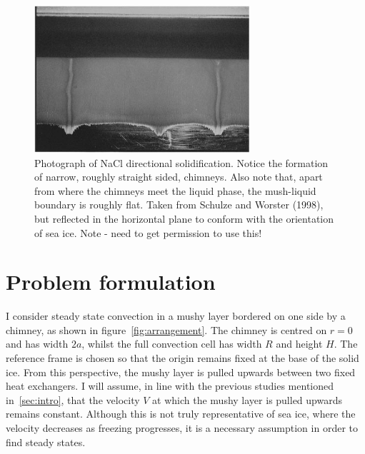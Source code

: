 \documentclass[11pt]{proc}
\begin{document}
\begin{figure}[t]
    \centering
    \includegraphics[width=8cm]{mushy-layer-chimneys-photo-schulze-worster.jpg}
    \caption{Photograph of NaCl directional solidification. Notice the formation of narrow, roughly straight sided, chimneys. Also note that, apart from where the chimneys meet the liquid phase, the mush-liquid boundary is roughly flat. Taken from Schulze and Worster (1998), but reflected in the horizontal plane to conform with the orientation of sea ice. Note - need to get permission to use this!}
    \label{fig:schulze-worster-photo}
\end{figure}


\section{Problem formulation}
\label{sec:problem-formulation}

I consider steady state convection in a mushy layer bordered on one side by a chimney, as shown in figure~\ref{fig:arrangement}. The chimney is centred on $r=0$ and has width $2a$, whilst the full convection cell has width $R$ and height $H$. The reference frame is chosen so that the origin remains fixed at the base of the solid ice. From this perspective, the mushy layer is pulled upwards between two fixed heat exchangers. I will assume, in line with the previous studies mentioned in~\autoref{sec:intro}, that the velocity $V$ at which the mushy layer is pulled upwards remains constant. Although this is not truly representative of sea ice, where the velocity decreases as freezing progresses, it is a necessary assumption in order to find  steady states.
\end{document}
